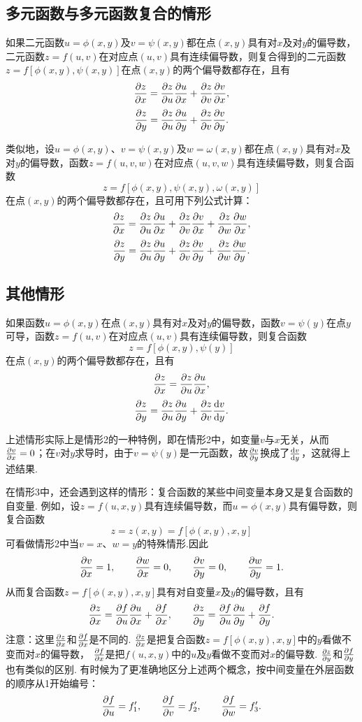 \subsection{多元函数与多元函数复合的情形}
\begin{theorem}
如果二元函数\(u=\phi(x,y)\)及\(v=\psi(x,y)\)都在点\((x,y)\)具有对\(x\)及对\(y\)的偏导数，二元函数\(z=f(u,v)\)在对应点\((u,v)\)具有连续偏导数，则复合得到的二元函数\(z=f[\phi(x,y),\psi(x,y)]\)在点\((x,y)\)的两个偏导数都存在，且有\[
\pdv{z}{x} = \pdv{z}{u}\pdv{u}{x} + \pdv{z}{v}\pdv{v}{x},
\]\[
\pdv{z}{y} = \pdv{z}{u}\pdv{u}{y} + \pdv{z}{v}\pdv{v}{y}.
\]
\end{theorem}
类似地，设\(u=\phi(x,y)\)、\(v=\psi(x,y)\)及\(w=\omega(x,y)\)都在点\((x,y)\)具有对\(x\)及对\(y\)的偏导数，函数\(z=f(u,v,w)\)在对应点\((u,v,w)\)具有连续偏导数，则复合函数\[
z = f[\phi(x,y),\psi(x,y),\omega(x,y)]
\]在点\((x,y)\)的两个偏导数都存在，且可用下列公式计算：\[
\pdv{z}{x} = \pdv{z}{u}\pdv{u}{x} + \pdv{z}{v}\pdv{v}{x} + \pdv{z}{w}\pdv{w}{x},
\]\[
\pdv{z}{y} = \pdv{z}{u}\pdv{u}{y} + \pdv{z}{v}\pdv{v}{y} + \pdv{z}{w}\pdv{w}{y}.
\]

\subsection{其他情形}
\begin{theorem}
如果函数\(u=\phi(x,y)\)在点\((x,y)\)具有对\(x\)及对\(y\)的偏导数，函数\(v=\psi(y)\)在点\(y\)可导，函数\(z=f(u,v)\)在对应点\((u,v)\)具有连续偏导数，则复合函数\[
z = f[\phi(x,y),\psi(y)]
\]在点\((x,y)\)的两个偏导数都存在，且有\[
\pdv{z}{x} = \pdv{z}{u} \pdv{u}{x},
\]\[
\pdv{z}{y} = \pdv{z}{u} \pdv{u}{y} + \pdv{z}{v} \dv{v}{y}.
\]
\end{theorem}
上述情形实际上是情形2的一种特例，即在情形2中，如变量\(v\)与\(x\)无关，从而\(\pdv{v}{x}=0\)；在\(v\)对\(y\)求导时，由于\(v=\psi(y)\)是一元函数，故\(\pdv{v}{y}\)换成了\(\dv{v}{y}\)，这就得上述结果.

在情形3中，还会遇到这样的情形：复合函数的某些中间变量本身又是复合函数的自变量.
例如，设\(z = f(u,x,y)\)具有连续偏导数，而\(u=\phi(x,y)\)具有偏导数，则复合函数\[
z = z(x,y) = f[\phi(x,y),x,y]
\]可看做情形2中当\(v=x\)、\(w=y\)的特殊情形.因此\[
\pdv{v}{x} = 1, \qquad \pdv{w}{x} = 0,
\qquad
\pdv{v}{y} = 0, \qquad \pdv{w}{y} = 1.
\]从而复合函数\(z = f[\phi(x,y),x,y]\)具有对自变量\(x\)及\(y\)的偏导数，且有\[
\pdv{z}{x} = \pdv{f}{u} \pdv{u}{x} + \pdv{f}{x},
\qquad
\pdv{z}{y} = \pdv{f}{u} \pdv{u}{y} + \pdv{f}{y}.
\]
注意：这里\(\pdv{z}{x}\)和\(\pdv{f}{x}\)是不同的.
\(\pdv{z}{x}\)是把复合函数\(z = f[\phi(x,y),x,y]\)中的\(y\)看做不变而对\(x\)的偏导数，
\(\pdv{f}{x}\)是把\(f(u,x,y)\)中的\(u\)及\(y\)看做不变而对\(x\)的偏导数.
\(\pdv{z}{y}\)和\(\pdv{f}{y}\)也有类似的区别.
有时候为了更准确地区分上述两个概念，按中间变量在外层函数的顺序从1开始编号：\[
\pdv{f}{u} = f_1', \qquad
\pdv{f}{v} = f_2', \qquad
\pdv{f}{w} = f_3'.
\]

